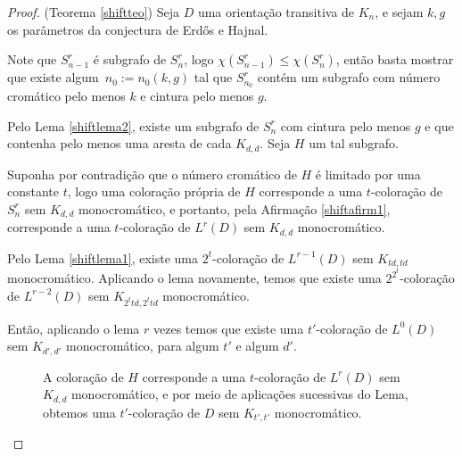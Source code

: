 \begin{proof}(Teorema \ref{shiftteo})
Seja $D$ uma orientação transitiva de $K_n$, e sejam $k,g$ os parâmetros da conjectura de Erd\H{o}s e Hajnal.

Note que $S_{n-1}^r$ é subgrafo de $S_n^r$, logo $\chi(S_{n-1}^r) \leq \chi(S_n^r)$, então basta mostrar que existe algum~$n_0 := n_0(k,g)$ tal que $S_{n_0}^r$ contém um subgrafo com número cromático pelo menos $k$ e cintura pelo menos $g$.

Pelo Lema \ref{shiftlema2}, existe um subgrafo de $S_n^r$ com cintura pelo menos $g$ e que contenha pelo menos uma aresta de cada $K_{d,d}$. Seja $H$ um tal subgrafo.

Suponha por contradição que o número cromático de $H$ é limitado por uma constante $t$, logo uma coloração própria de $H$ corresponde a uma $t$-coloração de $S_n^r$ sem $K_{d,d}$ monocromático, e portanto, pela Afirmação \ref{shiftafirm1}, corresponde a uma $t$-coloração de $L^r(D)$ sem $K_{d,d}$ monocromático.

Pelo Lema \ref{shiftlema1}, existe uma $2^t$-coloração de $L^{r-1}(D)$ sem $K_{td,td}$ monocromático. Aplicando o lema novamente, temos que existe uma $2^{2^t}$-coloração de $L^{r-2}(D)$ sem $K_{2^ttd,2^ttd}$ monocromático.

Então, aplicando o lema $r$ vezes temos que existe uma $t'$-coloração de $L^0(D)$ sem $K_{d',d'}$ monocromático, para algum $t'$ e algum $d'$. 

\begin{figure}[H]
\centering
{}
\caption{A coloração de $H$ corresponde a uma $t$-coloração de $L^r(D)$ sem $K_{d,d}$ monocromático, e por meio de aplicações sucessivas do Lema, obtemos uma $t'$-coloração de $D$ sem $K_{t',t'}$ monocromático.}
\label{fig:shiftsequence}
\end{figure}


\end{proof}

